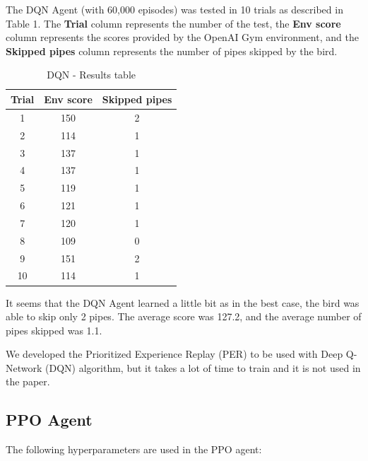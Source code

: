 \documentclass[letterpaper]{article}
\begin{document}
The DQN Agent (with 60,000 episodes) was tested in 10 trials as described in Table 1. The \textbf{Trial} column represents the number of the test, the \textbf{Env score} column represents the scores provided by the OpenAI Gym environment, and the \textbf{Skipped pipes} column represents the number of pipes skipped by the bird.

\begin{table}[h]
    \centering
    \begin{tabular}{|c||c|c|}
    \hline
    Trial & Env score & Skipped pipes \\
    \hline
    1 & 150 & 2 \\
    \hline
    2 & 114 & 1 \\
    \hline
    3 & 137 & 1 \\
    \hline
    4 & 137 & 1 \\
    \hline
    5 & 119 & 1 \\
    \hline
    6 & 121 & 1 \\
    \hline
    7 & 120 & 1 \\
    \hline
    8 & 109 & 0 \\
    \hline
    9 & 151 & 2 \\
    \hline
    10 & 114 & 1 \\
    \hline
    \end{tabular}
    \caption{DQN - Results table}
    \label{tab:dqn_table}
\end{table}

It seems that the DQN Agent learned a little bit as in the best case, the bird was able to skip only 2 pipes. The average score was 127.2, and the average number of pipes skipped was 1.1.

We developed the Prioritized Experience Replay (PER) to be used with Deep Q-Network (DQN) algorithm, but it takes a lot of time to train and it is not used in the paper.

\subsection{PPO Agent}

The following hyperparameters are used in the PPO agent:
\end{document}

